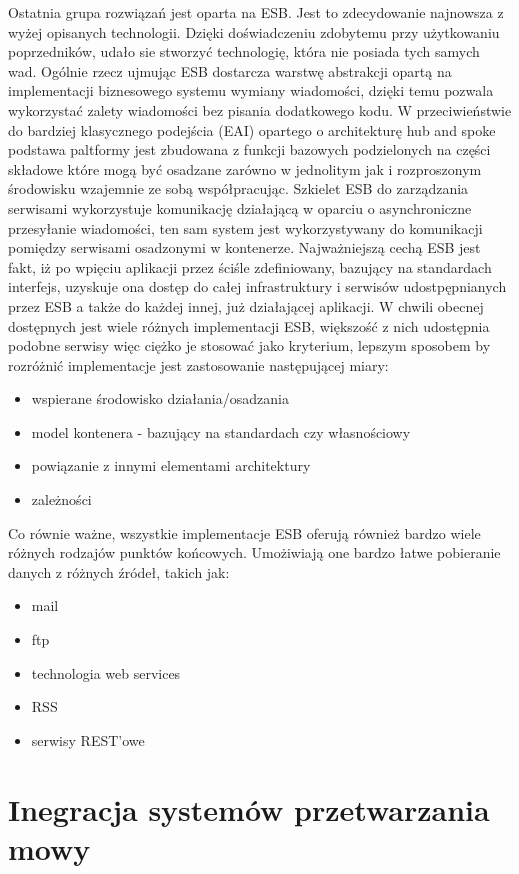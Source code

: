 Ostatnia grupa rozwiązań jest oparta na ESB. Jest to zdecydowanie najnowsza z wyżej opisanych technologii. Dzięki doświadczeniu zdobytemu przy użytkowaniu poprzedników, udało sie stworzyć technologię, która nie posiada tych samych wad. Ogólnie rzecz ujmując ESB dostarcza warstwę abstrakcji opartą na implementacji biznesowego systemu wymiany wiadomości, dzięki temu pozwala wykorzystać zalety wiadomości bez pisania dodatkowego kodu. W przeciwieństwie do bardziej klasycznego podejścia (EAI) opartego o architekturę hub and spoke podstawa paltformy jest zbudowana z funkcji bazowych podzielonych na części składowe które mogą być osadzane zarówno w jednolitym jak i rozproszonym środowisku wzajemnie ze sobą współpracując. Szkielet ESB do zarządzania serwisami wykorzystuje komunikację działającą w oparciu o asynchroniczne przesyłanie wiadomości, ten sam system jest wykorzystywany do komunikacji pomiędzy serwisami osadzonymi w kontenerze. Najważniejszą cechą ESB jest fakt, iż po wpięciu aplikacji przez ściśle zdefiniowany, bazujący na standardach interfejs, uzyskuje ona dostęp do całej infrastruktury i serwisów udostpępnianych przez ESB a także do każdej innej, już działającej aplikacji. W chwili obecnej dostępnych jest wiele różnych implementacji ESB, większość z nich udostępnia podobne serwisy więc ciężko je stosować jako kryterium, lepszym sposobem by rozróżnić implementacje jest zastosowanie następującej miary:
\begin{itemize}
	\item wspierane środowisko działania/osadzania
	\item model kontenera - bazujący na standardach czy własnościowy
	\item powiązanie z innymi elementami architektury
	\item zależności
\end{itemize}
Co równie ważne, wszystkie implementacje ESB oferują również bardzo wiele różnych rodzajów punktów końcowych. Umożiwiają one bardzo łatwe pobieranie danych z różnych źródeł, takich jak:
\begin{itemize}
	\item mail
	\item ftp
	\item technologia web services
	\item RSS
	\item serwisy REST'owe
\end{itemize}

\section{Inegracja systemów przetwarzania mowy}

